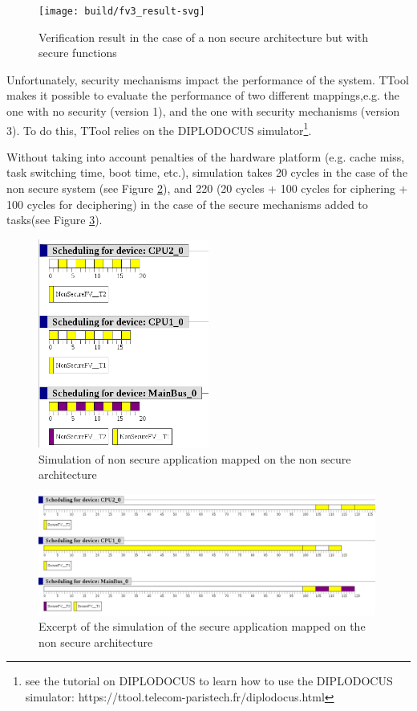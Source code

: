 \documentclass[12pt]{article}
\begin{document}
\begin{figure}[htbp]
\centering
\texttt{[image: build/fv3\_result-svg]}
\caption{Verification result in the case of a non secure architecture but with secure functions} \label{fig:fv3_result}
\end{figure}

Unfortunately, security mechanisms impact the performance of the system. TTool makes it possible to evaluate the performance of two different mappings,e.g. the one with no security (version 1), and the one with security mechanisms (version 3). To do this, TTool relies on the DIPLODOCUS simulator\footnote{see the tutorial on DIPLODOCUS to learn how to use the DIPLODOCUS simulator: https://ttool.telecom-paristech.fr/diplodocus.html}.

Without taking into account penalties of the hardware platform (e.g. cache miss, task switching time, boot time, etc.), simulation takes 20 cycles in the case of the non secure system (see Figure \ref{fig:simu_mapping1}), and 220 (20 cycles + 100 cycles for ciphering + 100 cycles for deciphering) in the case of the secure mechanisms added to tasks(see Figure \ref{fig:simu_mapping3}).

\begin{figure}[htbp]
\centering
\includegraphics[width=0.5\textwidth]{fig/simu_mapping1}
\caption{Simulation of non secure application mapped on the non secure architecture} \label{fig:simu_mapping1}
\end{figure}

\begin{figure}[htbp]
\centering
\includegraphics[width=0.99\textwidth]{fig/simu_mapping3}
\caption{Excerpt of the simulation of the secure application mapped on the non secure architecture} \label{fig:simu_mapping3}
\end{figure}
\end{document}
